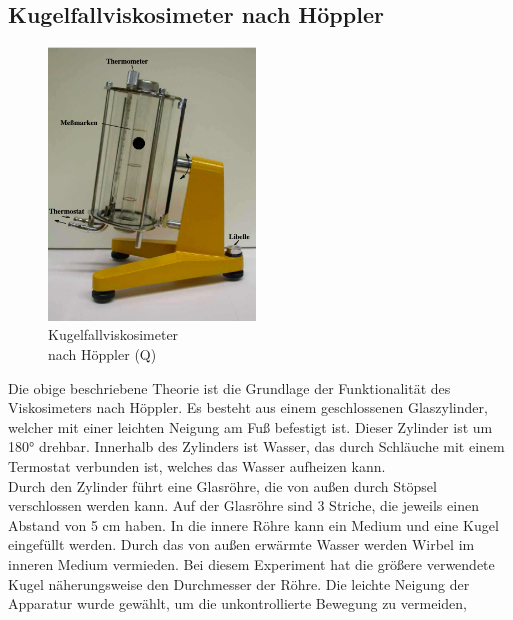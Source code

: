         \subsection{Kugelfallviskosimeter nach Höppler}
            \begin{figure}
                \begin{center}
                    \includegraphics[width=5.5cm]{content/Viskosimeter.png}
                    \caption[width=5.5cm]{Kugelfallviskosimeter\\nach Höppler (Q\cite{anleitungV207})}
                \end{center}
                
                \label{fig:Kugelfallviskosimeter}
            \end{figure}
            Die obige beschriebene Theorie ist die Grundlage der Funktionalität des Viskosimeters 
            nach Höppler. Es besteht aus einem geschlossenen Glaszylinder, 
            welcher mit einer leichten Neigung am Fuß befestigt
            ist. Dieser Zylinder ist um 180° drehbar. 
            Innerhalb des Zylinders ist Wasser, das durch Schläuche mit einem Termostat verbunden ist,
            welches das Wasser aufheizen kann. \\
            Durch den Zylinder führt eine Glasröhre, die von außen durch Stöpsel 
            verschlossen werden kann. Auf der Glasröhre sind 3 Striche, die jeweils 
            einen Abstand von 5 \unit{\centi\meter} haben. In die innere Röhre kann
            ein Medium und eine Kugel eingefüllt werden. Durch das von außen erwärmte Wasser werden Wirbel im inneren Medium vermieden. 
            Bei diesem Experiment hat die größere verwendete Kugel näherungsweise den Durchmesser der Röhre. 
            Die leichte Neigung der Apparatur wurde gewählt, um die unkontrollierte Bewegung zu vermeiden, 
